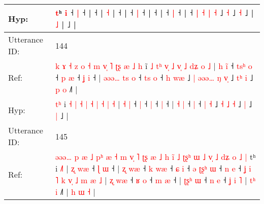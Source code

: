\documentclass[10pt]{article}
\DeclareRobustCommand{\hl}[1]{{\textcolor{red}{#1}}}
\begin{document}
\begin{longtable}{ll}
 \\
Hyp: & \hl{}\hl{t}ʰ \hl{i} ˧\hl{}\hl{} \hl{|} ˧\hl{}\hl{}\hl{}\hl{}\hl{}\hl{} |\hl{}\hl{}\hl{}\hl{} ˧\hl{}\hl{}\hl{}\hl{}\hl{}\hl{}\hl{} |\hl{}\hl{}\hl{}\hl{}\hl{} \hl{}\hl{˧} |\hl{}\hl{}\hl{}\hl{}\hl{} ˧ |\hl{}\hl{} ˧ \hl{}\hl{|} ˧\hl{} |\hl{}\hl{}\hl{}\hl{}\hl{}\hl{} ˧\hl{}\hl{}\hl{}\hl{}\hl{}\hl{}\hl{}\hl{}\hl{}\hl{}\hl{}\hl{}\hl{} |\hl{}\hl{} ˧ \hl{}\hl{|} ˧\hl{} |\hl{}\hl{}\hl{}\hl{}\hl{}\hl{}\hl{}\hl{}\hl{}\hl{}\hl{} ˧\hl{}\hl{}\hl{}\hl{}\hl{}\hl{}\hl{}\hl{}\hl{}\hl{} \hl{|} \hl{˧} \hl{|} \hl{}\hl{˧} ˩\hl{}\hl{}\hl{}\hl{} \hl{˧} ˩ \hl{}\hl{˧} ˩ |\hl{}\hl{}\hl{}\hl{}\hl{} \hl{}\hl{˩} |\hl{}\hl{}\hl{}\hl{}\hl{}\hl{} ˩\hl{}\hl{}\hl{}\hl{}\hl{}\hl{} |
 \\
\midrule
Utterance ID: & 144 \\
Ref: & \hl{k}\hl{ }\hl{ɤ}\hl{ }\hl{˧}\hl{ }\hl{z}\hl{ }\hl{o}\hl{ }\hl{˧}\hl{ }\hl{m}\hl{ }\hl{v}\hl{̩}\hl{ }\hl{˥}\hl{ }\hl{ʈ}\hl{ʂ}\hl{ }\hl{æ}\hl{ }\hl{˩}\hl{ }\hl{h} i\hl{̃} \hl{˩} \hl{t}\hl{ʰ} \hl{v}\hl{̩} \hl{˩} \hl{v}\hl{̩} \hl{˩} \hl{d}\hl{ʑ} \hl{o} \hl{˩} | \hl{h} \hl{i}\hl{̃} ˧\hl{ }\hl{t}\hl{s}\hl{ʰ} \hl{o} ˧\hl{ }\hl{p} \hl{æ} ˧\hl{ }\hl{ʝ} \hl{i} ˧ |\hl{ }\hl{ə}\hl{ə}\hl{ə}\hl{…} \hl{t}\hl{s} \hl{o} ˧\hl{ }\hl{t}\hl{s} \hl{o} ˧ \hl{h} \hl{w}\hl{æ} ˩\hl{ }\hl{|} \hl{ə}\hl{ə}\hl{ə}\hl{…} \hl{ŋ} \hl{v}\hl{̩} ˩\hl{ }\hl{t}\hl{ʰ} \hl{i} ˩\hl{ }\hl{p} \hl{o} ˩\hl{˥} |
 \\
Hyp: & \hl{}\hl{}\hl{}\hl{}\hl{}\hl{}\hl{}\hl{}\hl{}\hl{}\hl{}\hl{}\hl{}\hl{}\hl{}\hl{}\hl{}\hl{}\hl{}\hl{}\hl{}\hl{}\hl{}\hl{}\hl{}\hl{t}\hl{ʰ} i\hl{} \hl{˧} \hl{}\hl{|} \hl{}\hl{˧} \hl{|} \hl{}\hl{˧} \hl{|} \hl{}\hl{˧} \hl{|} \hl{˧} | \hl{˧} \hl{}\hl{|} ˧\hl{}\hl{}\hl{}\hl{} \hl{|} ˧\hl{}\hl{} \hl{|} ˧\hl{}\hl{} \hl{|} ˧ |\hl{}\hl{}\hl{}\hl{}\hl{} \hl{}\hl{˧} \hl{|} ˧\hl{}\hl{}\hl{} \hl{|} ˧ \hl{|} \hl{}\hl{˧} ˩\hl{}\hl{} \hl{}\hl{}\hl{}\hl{˧} \hl{˩} \hl{}\hl{˧} ˩\hl{}\hl{}\hl{} \hl{|} ˩\hl{}\hl{} \hl{|} ˩\hl{} |
 \\
\midrule
Utterance ID: & 145 \\
Ref: & \hl{ə}\hl{ə}\hl{ə}\hl{…}\hl{ }\hl{p}\hl{ }\hl{æ}\hl{ }\hl{˩}\hl{ }\hl{p}\hl{ʰ}\hl{ }\hl{æ}\hl{ }\hl{˧}\hl{ }\hl{m}\hl{ }\hl{v}\hl{̩}\hl{ }\hl{˥}\hl{ }\hl{ʈ}\hl{ʂ}\hl{ }\hl{æ}\hl{ }\hl{˩}\hl{ }\hl{h}\hl{ }\hl{i}\hl{̃}\hl{ }\hl{˩}\hl{ }\hl{ʈ}\hl{ʂ}\hl{ʰ}\hl{ }\hl{ɯ}\hl{ }\hl{˩}\hl{ }\hl{v}\hl{̩}\hl{ }\hl{˩}\hl{ }\hl{d}\hl{ʑ}\hl{ }\hl{o}\hl{ }\hl{˩}\hl{ }\hl{|}\hl{ }tʰ i \hl{˩}\hl{˥} |\hl{ }\hl{ʐ}\hl{ }\hl{w}\hl{æ} ˧\hl{ }\hl{ɭ} \hl{ɯ} ˧ |\hl{ }\hl{ʐ}\hl{ }\hl{w}\hl{æ} ˧\hl{ }\hl{k} \hl{w}\hl{æ} ˧\hl{ }\hl{ɕ} \hl{i} ˧\hl{ }\hl{ə}\hl{ }\hl{ʈ}\hl{ʂ}\hl{ʰ} \hl{ɯ} ˧\hl{ }\hl{n} \hl{e} ˧\hl{ }\hl{ʝ}\hl{ }\hl{i}\hl{ }\hl{˥}\hl{ }\hl{k}\hl{ }\hl{v}\hl{̩}\hl{ }\hl{˩}\hl{ }\hl{m} \hl{æ} \hl{˩} | \hl{ʐ} \hl{w}\hl{æ} ˧\hl{ }\hl{ʁ} \hl{o} ˧\hl{ }\hl{m} \hl{æ} ˧ | \hl{ʈ}\hl{ʂ}\hl{ʰ} \hl{ɯ} ˧\hl{ }\hl{n} \hl{e} ˧ \hl{ʝ} \hl{i} \hl{˥} |\hl{ }\hl{t}\hl{ʰ}\hl{ }\hl{i} ˩\hl{˥} | \hl{h} \hl{ɯ} \hl{˧} |

\end{longtable}
\end{document}
